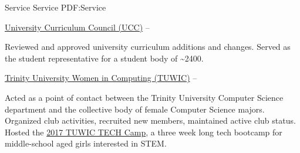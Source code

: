 \Section
{Service}
{Service}
{PDF:Service}

\Entry
\TrinityTitle
\SubEntry
\Gap
\href{https://inside.trinity.edu/academic-affairs/university-curriculum-council}
{University Curriculum Council (UCC)}
\dotfill
{} -- 
\begin{Detail}
    \SubBulletItem
    Reviewed and approved university curriculum additions and changes.
    \SubBulletItem
    Served as the student representative for a student body of \textasciitilde 2400.
\end{Detail}

\SubEntry
\Gap
\href{https://new.trinity.edu/news/get-program}
{Trinity University Women in Computing (TUWIC)}
\dotfill
{} -- 
\begin{Detail}
    \SubBulletItem
    Acted as a point of contact between the Trinity University Computer Science department and the collective body of female Computer Science majors.
    \SubBulletItem
    Organized club activities, recruited new members, maintained active club status.
    \SubBulletItem
    Hosted the \href{http://www.cs.trinity.edu/~tuwic/TECHcamp/}{2017 TUWIC TECH Camp}, a three week long tech bootcamp for middle-school aged girls interested in STEM.
\end{Detail}
